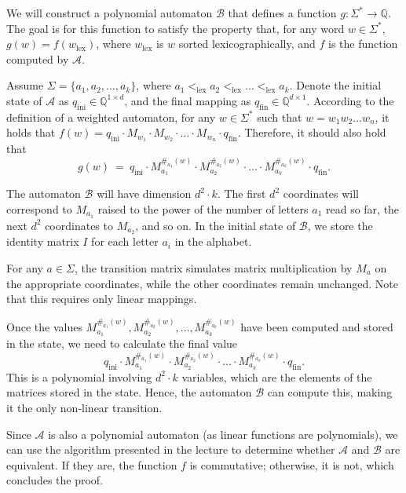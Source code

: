 \documentclass[12pt]{article}
\begin{document}
	\medskip
	
	We will construct a polynomial automaton \(\mathcal{B}\) that defines a
	function \(g : \Sigma^{\ast} \to \mathbb{Q}\). The goal is for this function
	to satisfy the property that, for any word \(w \in \Sigma^{\ast}\), \(g(w) =
	f(w_{\text{lex}})\), where \(w_{\text{lex}}\) is \(w\) sorted
	lexicographically, and \(f\) is the function computed by \(\mathcal{A}\).
	
	\medskip
	
	Assume \(\Sigma = \{a_{1}, a_{2}, \ldots, a_{k}\}\), where \(a_{1}
	<_{\text{lex}} a_{2} <_{\text{lex}} \ldots <_{\text{lex}} a_{k}\). Denote
	the initial state of \(\mathcal{A}\) as \(q_{\text{ini}} \in
	\mathbb{Q}^{1 \times d}\), and the final mapping as \(q_{\text{fin}} \in
	\mathbb{Q}^{d \times 1}\). According to the definition of a weighted
	automaton, for any \(w \in \Sigma^{\ast}\) such that \(w = w_{1} w_{2}
	\ldots w_{n}\), it holds that \(f(w) = q_{\text{ini}} \cdot M_{w_{1}} \cdot
	M_{w_{2}} \cdot \ldots \cdot M_{w_{n}} \cdot q_{\text{fin}}\). Therefore, it
	should also hold that
	\[ g(w) \ = \ q_{\text{ini}} \cdot M_{a_{1}}^{\#_{a_{1}}(w)} \cdot
	M_{a_{2}}^{\#_{a_{2}}(w)} \cdot \ldots \cdot M_{a_{k}}^{\#_{a_{k}}(w)} \cdot
	q_{\text{fin}} \text{.} \]
	
	\medskip
	
	The automaton \(\mathcal{B}\) will have dimension \(d^{2} \cdot k\). The
	first \(d^{2}\) coordinates will correspond to \(M_{a_{1}}\) raised to the
	power of the number of letters \(a_{1}\) read so far, the next \(d^{2}\)
	coordinates to \(M_{a_{2}}\), and so on. In the initial state of
	\(\mathcal{B}\), we store the identity matrix \(I\) for each letter
	\(a_{i}\) in the alphabet.
	
	\medskip
	
	For any \(a \in \Sigma\), the transition matrix simulates matrix
	multiplication by \(M_{a}\) on the appropriate coordinates, while the other
	coordinates remain unchanged. Note that this requires only linear mappings.
	
	\medskip
	
	Once the values \(M_{a_{1}}^{\#_{a_{1}}(w)}, M_{a_{2}}^{\#_{a_{2}}(w)},
	\ldots, M_{a_{k}}^{\#_{a_{k}}(w)}\) have been computed and stored in the
	state, we need to calculate the final value
	\[ q_{\text{ini}} \cdot M_{a_{1}}^{\#_{a_{1}}(w)} \cdot
	M_{a_{2}}^{\#_{a_{2}}(w)} \cdot \ldots \cdot M_{a_{k}}^{\#_{a_{k}}(w)} \cdot
	q_{\text{fin}} \text{.} \]
	This is a polynomial involving \(d^{2} \cdot k\) variables, which are the
	elements of the matrices stored in the state. Hence, the automaton
	\(\mathcal{B}\) can compute this, making it the only non-linear transition.
	
	\medskip
	
	Since \(\mathcal{A}\) is also a polynomial automaton (as linear functions
	are polynomials), we can use the algorithm presented in the lecture to
	determine whether \(\mathcal{A}\) and \(\mathcal{B}\) are equivalent. If
	they are, the function \(f\) is commutative; otherwise, it is not, which
	concludes the proof.
\end{document}
